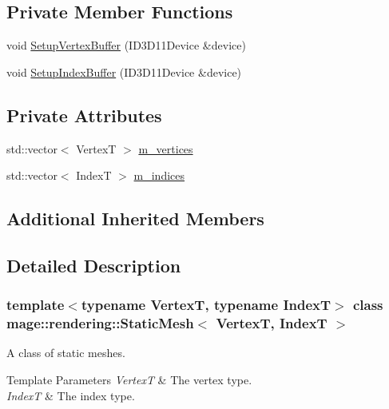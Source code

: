 \subsection*{Private Member Functions}
\begin{DoxyCompactItemize}
\item 
void \mbox{\hyperlink{classmage_1_1rendering_1_1_static_mesh_a3769fb5361fb09e727748c281c39a824}{Setup\+Vertex\+Buffer}} (I\+D3\+D11\+Device \&device)
\item 
void \mbox{\hyperlink{classmage_1_1rendering_1_1_static_mesh_acd815df7e87dde687613e3f4d5acc564}{Setup\+Index\+Buffer}} (I\+D3\+D11\+Device \&device)
\end{DoxyCompactItemize}
\subsection*{Private Attributes}
\begin{DoxyCompactItemize}
\item 
std\+::vector$<$ VertexT $>$ \mbox{\hyperlink{classmage_1_1rendering_1_1_static_mesh_ae34755a64d965a9e8c5d32c0c2371424}{m\+\_\+vertices}}
\item 
std\+::vector$<$ IndexT $>$ \mbox{\hyperlink{classmage_1_1rendering_1_1_static_mesh_a917240e2f91db85a7f03e8cca766fb26}{m\+\_\+indices}}
\end{DoxyCompactItemize}
\subsection*{Additional Inherited Members}


\subsection{Detailed Description}
\subsubsection*{template$<$typename VertexT, typename IndexT$>$\newline
class mage\+::rendering\+::\+Static\+Mesh$<$ Vertex\+T, Index\+T $>$}

A class of static meshes.


\begin{DoxyTemplParams}{Template Parameters}
{\em VertexT} & The vertex type. \\
\hline
{\em IndexT} & The index type. \\
\hline
\end{DoxyTemplParams}


